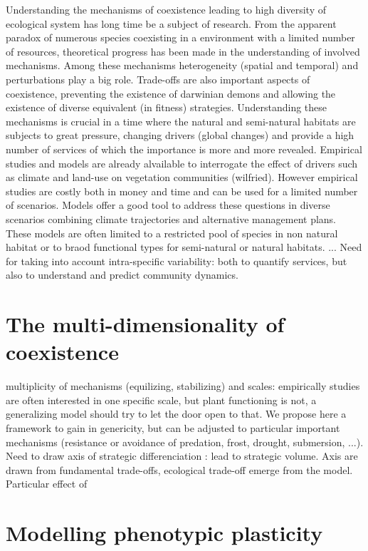 \documentclass[review]{elsarticle}
\begin{document}
Understanding the mechanisms of coexistence leading to high diversity of ecological system has long time be a subject of research. From the apparent paradox of numerous species coexisting in a environment with a limited number of resources, theoretical progress has been made in the understanding of involved mechanisms. Among these mechanisms heterogeneity (spatial and temporal) and perturbations play a big role. Trade-offs are also important aspects of coexistence, preventing the existence of darwinian demons and allowing the existence of diverse equivalent (in fitness) strategies. Understanding these mechanisms is crucial in a time where the natural and semi-natural habitats are subjects to great pressure, changing drivers (global changes) and provide a high number of services of which the importance is more and more revealed. Empirical studies and models are already alvailable to interrogate the effect of drivers such as climate and land-use on vegetation communities (wilfried). However empirical studies are costly both in money and time and can be used for a limited number of scenarios. Models offer a good tool to address these questions in diverse scenarios combining climate trajectories and alternative management plans. These models are often limited to a restricted pool of species in non natural habitat or to braod functional types for semi-natural or natural habitats. ...
Need for taking into account intra-specific variability: both to quantify services, but also to understand and predict community dynamics.


\section{The multi-dimensionality of coexistence}
multiplicity of mechanisms (equilizing, stabilizing) and scales: empirically studies are often interested in one specific scale, but plant functioning is not, a generalizing model should try to let the door open to that. We propose here a framework to gain in genericity, but can be adjusted to particular important mechanisms (resistance or avoidance of predation, frost, drought, submersion, ...).\\
Need to draw axis of strategic differenciation : lead to strategic volume. Axis are drawn from fundamental trade-offs, ecological trade-off emerge from the model.\\
Particular effect of 


\section{Modelling phenotypic plasticity}
\end{document}
